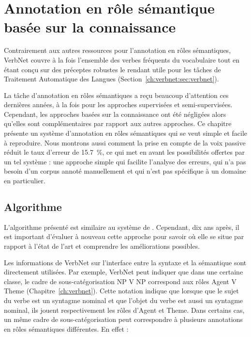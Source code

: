 \chapter{Annotation en rôle sémantique basée sur la connaissance}
\label{ch:srl}



Contrairement aux autres ressources pour l'annotation en rôles sémantiques,
VerbNet couvre à la fois l'ensemble des verbes fréquents du vocabulaire tout en
étant conçu sur des préceptes robustes le rendant utile pour les tâches de
Traitement Automatique des Langues (Section~\ref{ch:verbnet:sec:verbnet}).

La tâche d'annotation en rôles sémantiques a reçu beaucoup d'attention ces
dernières années, à la fois pour les approches supervisées et semi-supervisées.
Cependant, les approches basées sur la connaissance ont été négligées alors
qu'elles sont complémentaires par rapport aux autres approches. Ce chapitre
présente un système d'annotation en rôles sémantiques qui se veut simple et
facile à reproduire. Nous montrons aussi comment la prise en compte de la voix
passive réduit le taux d'erreur de 15.7~\%, ce qui met en avant les
possibilités offertes par un tel système : une approche simple qui facilite
l'analyse des erreurs, qui n'a pas besoin d'un corpus annoté manuellement et
qui n'est pas spécifique à un domaine en particulier.

\section{Algorithme}

L'algorithme présenté est similaire au système de
\cite{swier2004unsupervised,swier2005exploiting}. Cependant, dix ans après, il
est important d'évaluer à nouveau cette approche pour savoir où elle se situe
par rapport à l'état de l'art et comprendre les améliorations possibles.

Les informations de VerbNet sur l'interface entre la syntaxe et la sémantique
sont directement utilisées. Par exemple, VerbNet peut indiquer que dans une
certaine classe, le cadre de sous-catégorisation NP V NP correspond aux rôles
Agent V Theme (Chapitre~\ref{ch:verbnet}). Cette notation indique que lorsque
que le sujet du verbe est un syntagme nominal et que l'objet du verbe est aussi
un syntagme nominal, ils jouent respectivement les rôles d'Agent et Theme. Dans
certains cas, un même cadre de sous-catégorisation peut correspondre à
plusieurs annotations en rôles sémantiques différentes. En effet :

